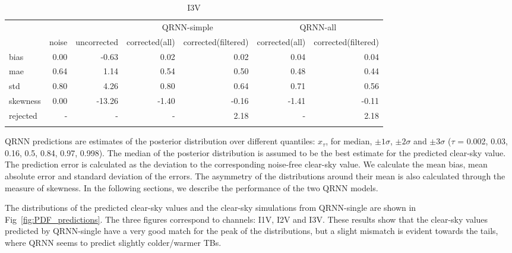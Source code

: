 \documentclass[amt, manuscript]{copernicus}
\begin{document}
\begin{table}[t]
	\caption{I3V}
	\label{tab:I3V_statistics}
	\begin{tabular}{lrrrrrr}
		\tophline
		&&& \multicolumn{2}{c}{QRNN-simple} & \multicolumn{2}{c}{QRNN-all}\\
		&   noise &   uncorrected &   corrected(all) &   corrected(filtered) & corrected(all) &   corrected(filtered) \\
		\middlehline
		bias     &   0.00 &         -0.63 &            0.02 &                 0.02& 0.04 &                 0.04 \\
		mae      &    0.64 &          1.14 &            0.54 &                 0.50&0.48 &                 0.44 \\
		std      &    0.80 &          4.26 &            0.80 &                 0.64&0.71 &                 0.56 \\
		skewness &   0.00 &        -13.26 &           -1.40 &                -0.16&-1.41 &                -0.11 \\
		rejected &    - &          - &           - &                 2.18&- &                 2.18 \\
		\bottomhline
	\end{tabular}
	\belowtable{} %
\end{table}
QRNN predictions are estimates of the posterior distribution over different quantiles: $x_{\tau}$, for median, $\pm 1\sigma$, $\pm 2 \sigma$ and  $\pm 3 \sigma$ ($\tau$ = 0.002, 0.03, 0.16, 0.5, 0.84, 0.97, 0.998). The median of the posterior distribution is assumed to be the best estimate for the predicted clear-sky value. The prediction error is calculated as the deviation to the corresponding noise-free clear-sky value. We calculate the mean bias, mean absolute error and standard deviation of the errors. The asymmetry of the distributions around their mean is also calculated through the measure of skewness. In the following sections, we describe the performance of the two QRNN models.

The distributions of the predicted clear-sky values and the clear-sky simulations from QRNN-single are shown in Fig~\ref{fig:PDF_predictions}. The three figures correspond to channels: I1V, I2V and I3V. These results show that the clear-sky values predicted by QRNN-single have a very good match for the peak of the distributions, but a slight mismatch is evident towards the tails, where QRNN seems to predict slightly colder/warmer TBs. 
\end{document}
